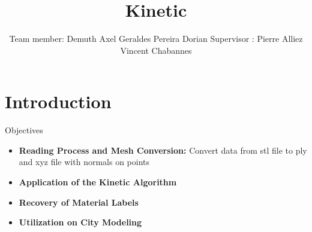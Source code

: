 \documentclass[10pt]{beamer}
\title{Kinetic}
\author[Demuth Axel, Geraldes Pereira Dorian]{Team member: \newline\newline Demuth Axel \newline Geraldes Pereira Dorian \newline\newline Supervisor :  \newline\newline Pierre Alliez \newline Vincent Chabannes}
\date{}
\begin{document}
\frame{\titlepage}
\begin{frame}
    \tableofcontents
\end{frame}
\section{Introduction}
\begin{frame}{Objectives}
\begin{itemize}
    \item \textbf{Reading Process and Mesh Conversion: }Convert data from stl file to ply and xyz file with normals on points
    
    \item \textbf{Application of the Kinetic Algorithm}
    
    \item \textbf{Recovery of Material Labels}
    
    \item \textbf{Utilization on City Modeling}
\end{itemize}
\end{frame}
\end{document}
